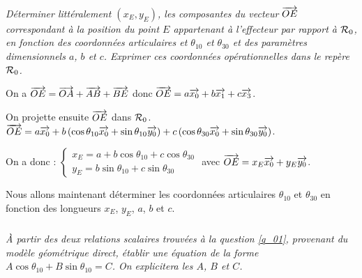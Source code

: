 \documentclass[10pt,fleqn]{article} %
\begin{document}
\fi
\subparagraph{\label{q_01}}\textit{Déterminer littéralement $\left(x_E,y_E\right)$, les composantes du vecteur $\overrightarrow{OE}$ correspondant à la position du
point $E$ appartenant à l’effecteur par rapport à $\mathcal{R}_{0}$, en fonction des coordonnées articulaires et $\theta_{10}$ et $\theta_{30}$ et des
paramètres dimensionnels $a$, $b$ et $c$. Exprimer ces coordonnées opérationnelles dans le repère $\mathcal{R}_{0}$.}
\ifprof
\begin{corrige}
On a $\overrightarrow{OE}=\overrightarrow{OA}+\overrightarrow{AB}+\overrightarrow{BE}$ donc $\overrightarrow{OE}=a\overrightarrow{x_0}+b\overrightarrow{x_1}+c\overrightarrow{x_3}$.

On projette ensuite $\overrightarrow{OE}$ dans $\mathcal{R}_{0}$.
$\overrightarrow{OE}=a\overrightarrow{x_0}+b\left(\cos\theta_{10}\overrightarrow{x_{0}}+\sin\theta_{10}\overrightarrow{y_{0}} \right)+c\left(\cos\theta_{30}\overrightarrow{x_{0}}+\sin\theta_{30}\overrightarrow{y_{0}} \right)$.

On a donc :
$
\left\{\begin{array}{l}
x_E = a+b\cos\theta_{10} +c\cos\theta_{30} \\
y_E =     b\sin\theta_{10}  +c\sin\theta_{30}
\end{array} \right.$ avec $\overrightarrow{OE}=x_E\overrightarrow{x_{0}}+y_E\overrightarrow{y_{0}}$. 

\end{corrige}
\else
\fi

Nous allons maintenant déterminer les coordonnées articulaires $\theta_{10}$ et $\theta_{30}$ en fonction des longueurs $x_E$, $y_E$, $a$, $b$ et $c$.

\subparagraph{\label{q_02}}\textit{À partir des deux relations scalaires trouvées à la question \ref{q_01}, provenant du modèle géométrique direct, établir une équation de la forme $A\cos\theta_{10}+ B\sin\theta_{10} = C$. On explicitera les $A$, $B$ et $C$.}
\end{document}
